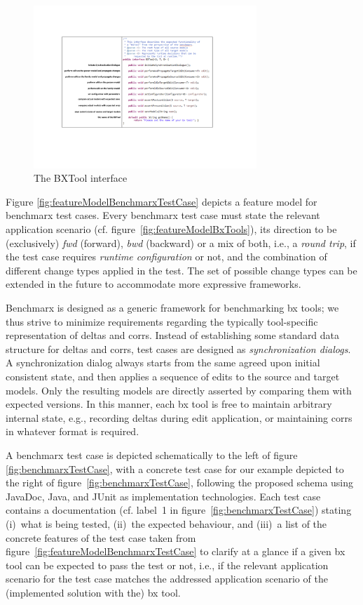 \begin{figure}[bt]
	\centering
	\includegraphics[width=0.75\textwidth]{diagrams/benchmarx/BXTool}
	\caption{The BXTool interface}
	\label{fig:refImplementation}
\end{figure}

Figure \ref{fig:featureModelBenchmarxTestCase} depicts a feature model for benchmarx test cases. 
Every benchmarx test case must state the relevant application scenario (cf. figure~\ref{fig:featureModelBxTools}), its direction to be (exclusively) \emph{fwd} (forward), \emph{bwd} (backward) or a mix of both, i.e., a \emph{round trip}, if the test case requires \emph{runtime configuration} or not, and the combination of different change types applied in the test. 
The set of possible change types can be extended in the future to accommodate more expressive frameworks. 

Benchmarx is designed as a generic framework for benchmarking bx tools; we thus strive to minimize requirements regarding the typically tool-specific representation of deltas and corrs. 
Instead of establishing some standard data structure for deltas and corrs, test cases are designed as \emph{synchronization dialogs}. 
A synchronization dialog always starts from the same agreed upon initial consistent state, and then applies a sequence of edits to the source and target models. 
Only the resulting models are directly asserted by comparing them with expected versions.
In this manner, each bx tool is free to maintain arbitrary internal state, e.g., recording deltas during edit application, or maintaining corrs in whatever format is required.

A benchmarx test case is depicted schematically to the left of figure \ref{fig:benchmarxTestCase}, with a concrete test case for our example depicted to the right of figure~\ref{fig:benchmarxTestCase}, following the proposed schema using JavaDoc, Java, and JUnit as implementation technologies.
Each test case contains a documentation (cf. label~1 in figure~\ref{fig:benchmarxTestCase}) stating (i)~what is being tested, (ii)~the expected behaviour, and (iii)~a list of the concrete features of the test case taken from figure~\ref{fig:featureModelBenchmarxTestCase} to clarify at a glance if a given bx tool can be expected to pass the test or not, i.e., if the relevant application scenario for the test case matches the addressed application scenario of the (implemented solution with the) bx tool. 

